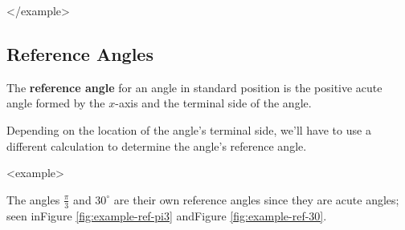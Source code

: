      \begin{center}
        \captionsetup{type=figure} 
          
            \label{fig:coterminal}
      \end{center}
    </example>

    \subsection*{Reference Angles}
    \begin{myDefinition}
        
          The \textbf{reference angle} for an angle in standard position is the positive acute angle formed by the $x$-axis and the terminal side of the angle.
        
    \end{myDefinition}
    
      Depending on the location of the angle's terminal side, we'll have to use a different calculation to determine the angle's reference angle.
    
    <example>
      
        The angles $\frac{\pi}{3}$ and $30^{\circ}$ are their own reference angles since they are acute angles; seen inFigure \ref{fig:example-ref-pi3} andFigure \ref{fig:example-ref-30}.
      

